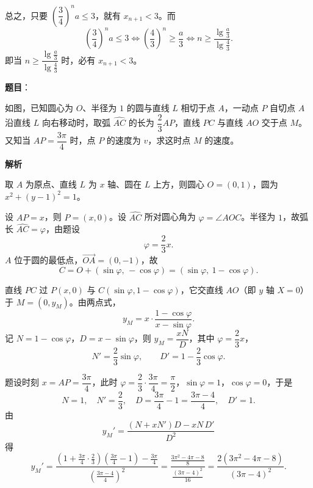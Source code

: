 \begin{answer}
总之，只要 $\left(\dfrac34\right)^n a\leqslant3$，就有 $x_{n+1}<3$。而
\nopagebreak[4]
\[
\left(\frac34\right)^n a\leqslant3\iff \left(\frac43\right)^n\geqslant\frac a3\iff n\geqslant\frac{\lg\frac a3}{\lg\frac43}.
\]
即当 $n\geqslant\dfrac{\lg\frac a3}{\lg\frac43}$ 时，必有 $x_{n+1}<3$。




\end{answer}
\begin{answer}

\textbf{题目}：

如图，已知圆心为 $O$、半径为 $1$ 的圆与直线 $L$ 相切于点 $A$，一动点 $P$ 自切点 $A$ 沿直线 $L$ 向右移动时，取弧 $\widehat{AC}$ 的长为 $\dfrac23 AP$，直线 $PC$ 与直线 $AO$ 交于点 $M$。又知当 $AP=\dfrac{3\pi}{4}$ 时，点 $P$ 的速度为 $v$，求这时点 $M$ 的速度。
\nopagebreak[4]
\begin{center}\end{center}
\nopagebreak[4]
\textbf{解析}
\nopagebreak[4]
\begin{center}\end{center}
\nopagebreak[4]
取 $A$ 为原点、直线 $L$ 为 $x$ 轴、圆在 $L$ 上方，则圆心 $O=(0,1)$，圆为 $x^2+(y-1)^2=1$。

设 $AP=x$，则 $P=(x,0)$。设 $\widehat{AC}$ 所对圆心角为 $\varphi=\angle AOC$。半径为 $1$，故弧长 $\widehat{AC}=\varphi$，由题设
\nopagebreak[4]
\[
\varphi=\frac23x.
\]
$A$ 位于圆的最低点，$\overrightarrow{OA}=(0,-1)$，故
\nopagebreak[4]
\[
C=O+(\sin\varphi,\,-\cos\varphi)=(\sin\varphi,\ 1-\cos\varphi).
\]

直线 $PC$ 过 $P(x,0)$ 与 $C(\sin\varphi,1-\cos\varphi)$，它交直线 $AO$（即 $y$ 轴 $X=0$）于 $M=(0,y_M)$。由两点式，
\nopagebreak[4]
\[
y_M=x\cdot\frac{1-\cos\varphi}{x-\sin\varphi}.
\]
记 $N=1-\cos\varphi$，$D=x-\sin\varphi$，则 $y_M=\dfrac{xN}D$，其中 $\varphi=\dfrac23x$，
\nopagebreak[4]
\[
N'=\frac23\sin\varphi,\qquad D'=1-\frac23\cos\varphi.
\]

题设时刻 $x=AP=\dfrac{3\pi}4$，此时 $\varphi=\dfrac23\cdot\dfrac{3\pi}4=\dfrac\pi2$，$\sin\varphi=1$，$\cos\varphi=0$，于是
\nopagebreak[4]
\[
N=1,\quad N'=\frac23,\quad D=\frac{3\pi}4-1=\frac{3\pi-4}4,\quad D'=1.
\]
由
\nopagebreak[4]
\[
y_M'=\frac{(N+xN')D-xN\,D'}{D^2}
\]
得
\nopagebreak[4]
\[
y_M'=\frac{\left(1+\frac{3\pi}4\cdot\frac23\right)\left(\frac{3\pi}4-1\right)-\frac{3\pi}4}{\left(\frac{3\pi-4}4\right)^2}
=\frac{\frac{3\pi^2-4\pi-8}{8}}{\frac{(3\pi-4)^2}{16}}
=\frac{2(3\pi^2-4\pi-8)}{(3\pi-4)^2}.
\]


\end{answer}
